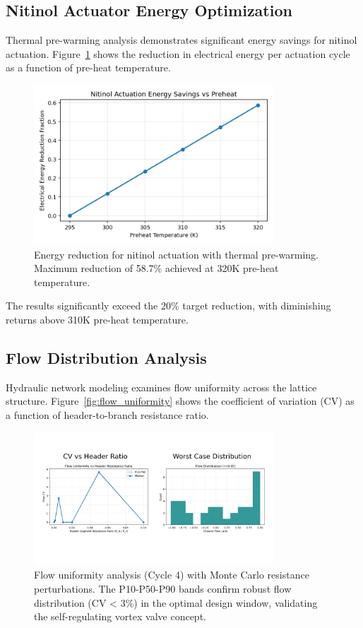 \subsection{Nitinol Actuator Energy Optimization}

Thermal pre-warming analysis demonstrates significant energy savings for nitinol actuation. Figure~\ref{fig:nitinol_savings} shows the reduction in electrical energy per actuation cycle as a function of pre-heat temperature.

\begin{figure}[H]
    \centering
    \includegraphics[width=0.8\textwidth]{figures/simulations/nitinol_energy_savings.png}
    \caption{Energy reduction for nitinol actuation with thermal pre-warming. Maximum reduction of 58.7\% achieved at 320K pre-heat temperature.}
    \label{fig:nitinol_savings}
\end{figure}

The results significantly exceed the 20\% target reduction, with diminishing returns above 310K pre-heat temperature.

\subsection{Flow Distribution Analysis}

Hydraulic network modeling examines flow uniformity across the lattice structure. Figure~\ref{fig:flow_uniformity} shows the coefficient of variation (CV) as a function of header-to-branch resistance ratio.

\begin{figure}[H]
    \centering
    \includegraphics[width=0.8\textwidth]{figures/simulations/fig_flow_uniformity_DEV_CYCLE_4.png}
    \caption{Flow uniformity analysis (Cycle 4) with Monte Carlo resistance perturbations. The P10-P50-P90 bands confirm robust flow distribution (CV < 3\%) in the optimal design window, validating the self-regulating vortex valve concept.}
\end{figure}

